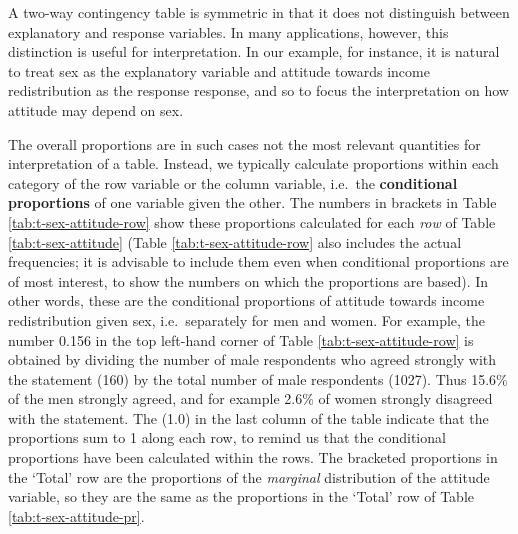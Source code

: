 \documentclass[11pt,a4paper,openany]{book}
\begin{document}
A two-way contingency table is symmetric in that it does not distinguish
between explanatory and response variables. In many applications,
however, this distinction is useful for interpretation. In our example,
for instance, it is natural to treat sex as the explanatory variable and
attitude towards income redistribution as the response response, and so
to focus the interpretation on how attitude may depend on sex.

The overall proportions are in such cases not the most relevant
quantities for interpretation of a table. Instead, we typically
calculate proportions within each category of the row variable or the
column variable, i.e.~the \textbf{conditional proportions} of one
variable given the other. The numbers in brackets in Table
\ref{tab:t-sex-attitude-row} show these proportions calculated for each
\emph{row} of Table \ref{tab:t-sex-attitude} (Table
\ref{tab:t-sex-attitude-row} also includes the actual frequencies; it is
advisable to include them even when conditional proportions are of most
interest, to show the numbers on which the proportions are based). In
other words, these are the conditional proportions of attitude towards
income redistribution given sex, i.e.~separately for men and women. For
example, the number 0.156 in the top left-hand corner of Table
\ref{tab:t-sex-attitude-row} is obtained by dividing the number of male
respondents who agreed strongly with the statement (160) by the total
number of male respondents (1027). Thus 15.6\% of the men strongly
agreed, and for example 2.6\% of women strongly disagreed with the
statement. The (1.0) in the last column of the table indicate that the
proportions sum to 1 along each row, to remind us that the conditional
proportions have been calculated within the rows. The bracketed
proportions in the `Total' row are the proportions of the
\emph{marginal} distribution of the attitude variable, so they are the
same as the proportions in the `Total' row of Table
\ref{tab:t-sex-attitude-pr}.
\end{document}
